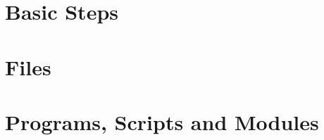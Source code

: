 \documentclass[12pt,a4paper]{book}
\begin{document}
\chapter{Basic Steps} \label{basic_steps}

%
%
\chapter{Files} %

%
\chapter{Programs, Scripts and Modules} %

%

%


\end{document}
